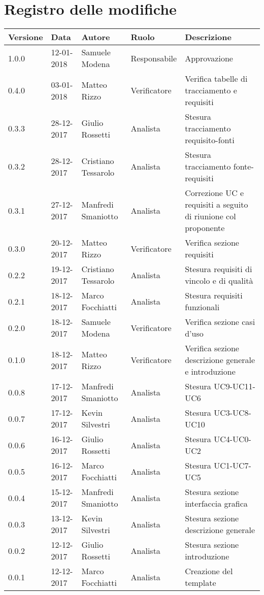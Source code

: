 \documentclass[./AnalisideiRequisiti.tex]{subfiles}
\begin{document}
	
\chapter*{Registro delle modifiche}
\begin{center}	
	\begin{tabular}{|l|l|l|l|p{4cm}|}
		\hline
		\textbf{Versione} & \textbf{Data} & \textbf{Autore} & \textbf{Ruolo} & \textbf{Descrizione} \\ \hline \hline	
		
		1.0.0 & 12-01-2018 & Samuele Modena & Responsabile & Approvazione\\ \hline
		0.4.0 & 03-01-2018 & Matteo Rizzo & Verificatore & Verifica tabelle di tracciamento e requisiti \\ \hline		
		0.3.3 & 28-12-2017 & Giulio Rossetti & Analista & Stesura tracciamento requisito-fonti\\ \hline	
		0.3.2 & 28-12-2017 & Cristiano Tessarolo & Analista & Stesura tracciamento fonte-requisiti\\ \hline
		0.3.1 & 27-12-2017 & Manfredi Smaniotto & Analista & Correzione UC e requisiti a seguito di riunione col proponente\\ \hline
	   	0.3.0 & 20-12-2017 & Matteo Rizzo & Verificatore & Verifica sezione requisiti\\ \hline
		
		0.2.2 & 19-12-2017 & Cristiano Tessarolo & Analista & Stesura requisiti di vincolo e di qualità\\ \hline
		
		0.2.1 & 18-12-2017 & Marco Focchiatti & Analista & Stesura requisiti funzionali \\ \hline
			
		0.2.0 & 18-12-2017 & Samuele Modena & Verificatore & Verifica sezione casi d’uso\\ \hline
		0.1.0 & 18-12-2017 & Matteo Rizzo & Verificatore & Verifica sezione descrizione generale e introduzione  \\ \hline
	
		0.0.8 & 17-12-2017 & Manfredi Smaniotto & Analista & Stesura UC9-UC11-UC6\\ \hline
		0.0.7 & 17-12-2017 & Kevin Silvestri & Analista & Stesura UC3-UC8-UC10\\ \hline
		0.0.6 & 16-12-2017 & Giulio Rossetti & Analista & Stesura UC4-UC0-UC2\\ \hline
		0.0.5 & 16-12-2017 & Marco Focchiatti & Analista & Stesura UC1-UC7-UC5\\ \hline
		0.0.4 & 15-12-2017 & Manfredi Smaniotto & Analista & Stesura sezione interfaccia grafica\\ \hline
		0.0.3 & 13-12-2017 & Kevin Silvestri & Analista & Stesura sezione descrizione generale\\ \hline
		0.0.2 & 12-12-2017 & Giulio Rossetti & Analista & Stesura sezione introduzione\\ \hline
		0.0.1 & 12-12-2017 & Marco Focchiatti & Analista & Creazione del template\\ \hline
	\end{tabular}
\end{center}	
\end{document}
